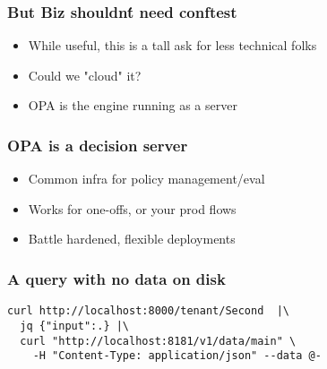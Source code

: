 \documentclass{beamer}
\begin{document}
\begin{frame}
\frametitle{But Biz shouldn\'t need conftest}
\begin{itemize}
  \item While useful, this is a tall ask for less technical folks
  \item Could we "cloud" it?
  \item OPA is the engine running as a server
\end{itemize}
\end{frame}

\begin{frame}
\frametitle{OPA is a decision server\footnotemark}
\begin{itemize}
  \item Common infra for policy management/eval 
  \item Works for one-offs, or your prod flows
  \item Battle hardened, flexible deployments
\end{itemize}
\end{frame}

\begin{frame}[fragile]
\frametitle{A query with no data on disk}
\begin{verbatim}
curl http://localhost:8000/tenant/Second  |\
  jq {"input":.} |\
  curl "http://localhost:8181/v1/data/main" \
    -H "Content-Type: application/json" --data @-
\end{verbatim}
\end{frame}
\end{document}
